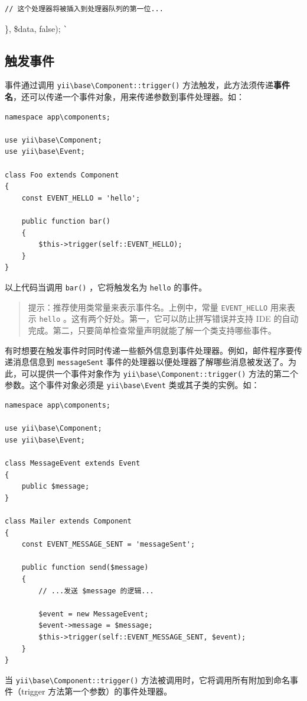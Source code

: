 \begin{lstlisting}
// 这个处理器将被插入到处理器队列的第一位...
\end{lstlisting}
\}, \$data, false);
\lstinline|`|

\subsection{触发事件}
事件通过调用 \texttt{yii{\allowbreak{}\textbackslash}base{\allowbreak{}\textbackslash}Component\allowbreak{}::\allowbreak{}trigger()} 方法触发，此方法须传递\textbf{事件名}，还可以传递一个事件对象，用来传递参数到事件处理器。如：

\lstset{language=php}\begin{lstlisting}
namespace app\components;

use yii\base\Component;
use yii\base\Event;

class Foo extends Component
{
    const EVENT_HELLO = 'hello';

    public function bar()
    {
        $this->trigger(self::EVENT_HELLO);
    }
}
\end{lstlisting}
以上代码当调用 \lstinline|bar()| ，它将触发名为 \lstinline|hello| 的事件。

\begin{quote}提示：推荐使用类常量来表示事件名。上例中，常量 \lstinline|EVENT_HELLO| 用来表示 \lstinline|hello| 。这有两个好处。第一，它可以防止拼写错误并支持 IDE 的自动完成。第二，只要简单检查常量声明就能了解一个类支持哪些事件。

\end{quote}
有时想要在触发事件时同时传递一些额外信息到事件处理器。例如，邮件程序要传递消息信息到 \lstinline|messageSent| 事件的处理器以便处理器了解哪些消息被发送了。为此，可以提供一个事件对象作为 \texttt{yii{\allowbreak{}\textbackslash}base{\allowbreak{}\textbackslash}Component\allowbreak{}::\allowbreak{}trigger()} 方法的第二个参数。这个事件对象必须是 \texttt{yii{\allowbreak{}\textbackslash}base{\allowbreak{}\textbackslash}Event} 类或其子类的实例。如：

\lstset{language=php}\begin{lstlisting}
namespace app\components;

use yii\base\Component;
use yii\base\Event;

class MessageEvent extends Event
{
    public $message;
}

class Mailer extends Component
{
    const EVENT_MESSAGE_SENT = 'messageSent';

    public function send($message)
    {
        // ...发送 $message 的逻辑...

        $event = new MessageEvent;
        $event->message = $message;
        $this->trigger(self::EVENT_MESSAGE_SENT, $event);
    }
}
\end{lstlisting}
当 \texttt{yii{\allowbreak{}\textbackslash}base{\allowbreak{}\textbackslash}Component\allowbreak{}::\allowbreak{}trigger()} 方法被调用时，它将调用所有附加到命名事件（trigger 方法第一个参数）的事件处理器。


